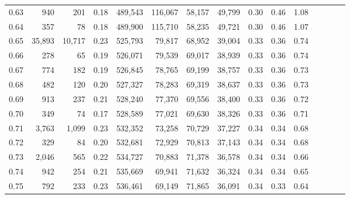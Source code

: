 \begin{tabular}{rrrcrrrrrrrrrrr}
0.63 &     940 &     201 &                                       0.18 &  489,543 &  116,067 &   58,157 &   49,799 &  0.30 &  0.46 &                         1.08 \\
0.64 &     357 &      78 &                                       0.18 &  489,900 &  115,710 &   58,235 &   49,721 &  0.30 &  0.46 &                         1.07 \\
0.65 &  35,893 &  10,717 &                                       0.23 &  525,793 &   79,817 &   68,952 &   39,004 &  0.33 &  0.36 &                         0.74 \\
0.66 &     278 &      65 &                                       0.19 &  526,071 &   79,539 &   69,017 &   38,939 &  0.33 &  0.36 &                         0.74 \\
0.67 &     774 &     182 &                                       0.19 &  526,845 &   78,765 &   69,199 &   38,757 &  0.33 &  0.36 &                         0.73 \\
0.68 &     482 &     120 &                                       0.20 &  527,327 &   78,283 &   69,319 &   38,637 &  0.33 &  0.36 &                         0.73 \\
0.69 &     913 &     237 &                                       0.21 &  528,240 &   77,370 &   69,556 &   38,400 &  0.33 &  0.36 &                         0.72 \\
0.70 &     349 &      74 &                                       0.17 &  528,589 &   77,021 &   69,630 &   38,326 &  0.33 &  0.36 &                         0.71 \\
0.71 &   3,763 &   1,099 &                                       0.23 &  532,352 &   73,258 &   70,729 &   37,227 &  0.34 &  0.34 &                         0.68 \\
0.72 &     329 &      84 &                                       0.20 &  532,681 &   72,929 &   70,813 &   37,143 &  0.34 &  0.34 &                         0.68 \\
0.73 &   2,046 &     565 &                                       0.22 &  534,727 &   70,883 &   71,378 &   36,578 &  0.34 &  0.34 &                         0.66 \\
0.74 &     942 &     254 &                                       0.21 &  535,669 &   69,941 &   71,632 &   36,324 &  0.34 &  0.34 &                         0.65 \\
0.75 &     792 &     233 &                                       0.23 &  536,461 &   69,149 &   71,865 &   36,091 &  0.34 &  0.33 &                         0.64 \\

\end{tabular}
